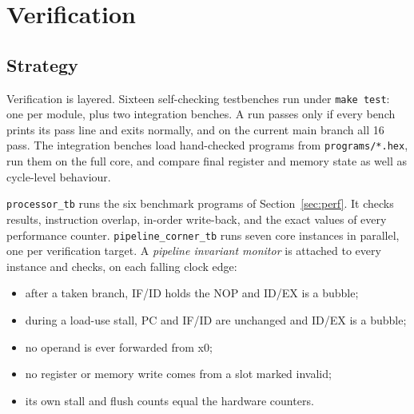 \documentclass[conference]{IEEEtran}
\newcommand{\code}[1]{\texttt{\small #1}}
\begin{document}
\section{Verification}
\label{sec:verif}

\subsection{Strategy}
Verification is layered. Sixteen self-checking testbenches run under \code{make test}: one per module, plus two integration benches. A run passes only if every bench prints its pass line and exits normally, and on the current main branch all 16 pass. The integration benches load hand-checked programs from \code{programs/*.hex}, run them on the full core, and compare final register and memory state as well as cycle-level behaviour.

\code{processor\_tb} runs the six benchmark programs of Section~\ref{sec:perf}. It checks results, instruction overlap, in-order write-back, and the exact values of every performance counter. \code{pipeline\_corner\_tb} runs seven core instances in parallel, one per verification target. A \emph{pipeline invariant monitor} is attached to every instance and checks, on each falling clock edge:
\begin{itemize}
  \item after a taken branch, IF/ID holds the NOP and ID/EX is a bubble;
  \item during a load-use stall, PC and IF/ID are unchanged and ID/EX is a bubble;
  \item no operand is ever forwarded from x0;
  \item no register or memory write comes from a slot marked invalid;
  \item its own stall and flush counts equal the hardware counters.
\end{itemize}
\end{document}
